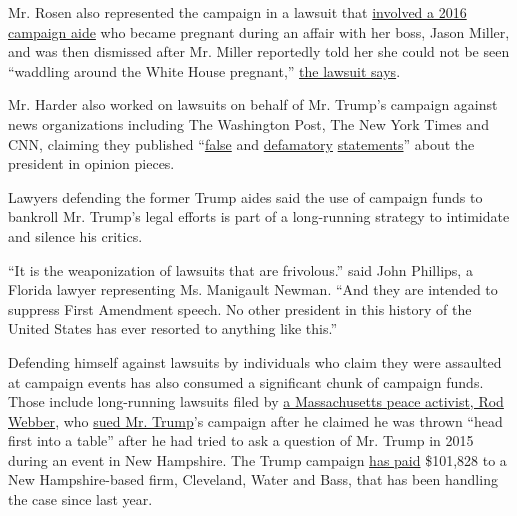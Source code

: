 Mr. Rosen also represented the campaign in a lawsuit that
\href{https://int.graylady3jvrrxbe.onion/data/documenttools/delgado-v-trump-lawrence-rosen-representing-for-trump/50b8cb15faec3842/full.pdf}{involved
a 2016 campaign aide} who became pregnant during an affair with her
boss, Jason Miller, and was then dismissed after Mr. Miller reportedly
told her she could not be seen ``waddling around the White House
pregnant,''
\href{https://www.courtlistener.com/docket/16624382/delgado-v-donald-j-trump-for-president-inc/}{the
lawsuit says}.

Mr. Harder also worked on lawsuits on behalf of Mr. Trump's campaign
against news organizations including The Washington Post, The New York
Times and CNN, claiming they published
``\href{https://int.graylady3jvrrxbe.onion/data/documenttools/draft-nyt-complaint-ny-state-court/5cc46831ddc43630/full.pdf}{false}
and
\href{https://int.graylady3jvrrxbe.onion/data/documenttools/complaint-wash-post-final/9685ced9fb0761c5/full.pdf}{defamatory}
\href{https://int.graylady3jvrrxbe.onion/data/documenttools/complaint-cnn/615d77f7192b4f85/full.pdf}{statements}''
about the president in opinion pieces.

Lawyers defending the former Trump aides said the use of campaign funds
to bankroll Mr. Trump's legal efforts is part of a long-running strategy
to intimidate and silence his critics.

``It is the weaponization of lawsuits that are frivolous.'' said John
Phillips, a Florida lawyer representing Ms. Manigault Newman. ``And they
are intended to suppress First Amendment speech. No other president in
this history of the United States has ever resorted to anything like
this.''

Defending himself against lawsuits by individuals who claim they were
assaulted at campaign events has also consumed a significant chunk of
campaign funds. Those include long-running lawsuits filed by
\href{https://rodwebber.wordpress.com/govt/}{a Massachusetts peace
activist, Rod Webber}, who
\href{https://www.courtlistener.com/docket/14587089/webber-v-deck/}{sued
Mr. Trump}'s campaign after he claimed he was thrown ``head first into a
table'' after he had tried to ask a question of Mr. Trump in 2015 during
an event in New Hampshire. The Trump campaign
\href{https://www.fec.gov/data/disbursements/?data_type=processed\&recipient_name=cleveland+waters\&two_year_transaction_period=2020\&two_year_transaction_period=2018\&two_year_transaction_period=2016}{has
paid} \$101,828 to a New Hampshire-based firm, Cleveland, Water and
Bass, that has been handling the case since last year.

